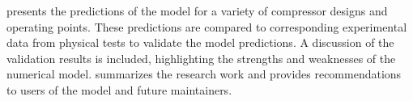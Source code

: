  presents the predictions of the model 
for a variety of compressor designs and operating points. 
These predictions are compared to corresponding experimental data 
from physical tests to validate the model predictions.
A discussion of the validation results is included, 
highlighting the strengths and weaknesses of the numerical model.
 summarizes the research work 
and provides recommendations to users of the model and future maintainers.

\citet{flow1984}

